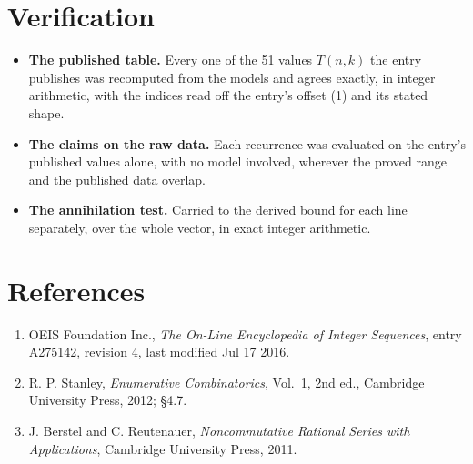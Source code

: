 \documentclass[11pt]{article}
\theoremstyle{definition}
\begin{document}
\section{Verification}

\begin{itemize}

\item {\bfseries The published table.} Every one of the 51 values $T(n,k)$ the entry publishes was recomputed from the models and agrees exactly, in integer arithmetic, with the indices read off the entry's offset (1) and its stated shape.

\item {\bfseries The claims on the raw data.} Each recurrence was evaluated on the entry's published values alone, with no model involved, wherever the proved range and the published data overlap.

\item {\bfseries The annihilation test.} Carried to the derived bound for each line separately, over the whole vector, in exact integer arithmetic.

\end{itemize}

\section{References}

\begin{enumerate}

\item OEIS Foundation Inc., \emph{The On-Line Encyclopedia of Integer Sequences}, entry \href{https://oeis.org/A275142}{A275142}, revision 4, last modified Jul 17 2016.

\item R. P. Stanley, \emph{Enumerative Combinatorics}, Vol.~1, 2nd ed., Cambridge University Press, 2012; \S4.7.

\item J. Berstel and C. Reutenauer, \emph{Noncommutative Rational Series with Applications}, Cambridge University Press, 2011.

\end{enumerate}
\end{document}
